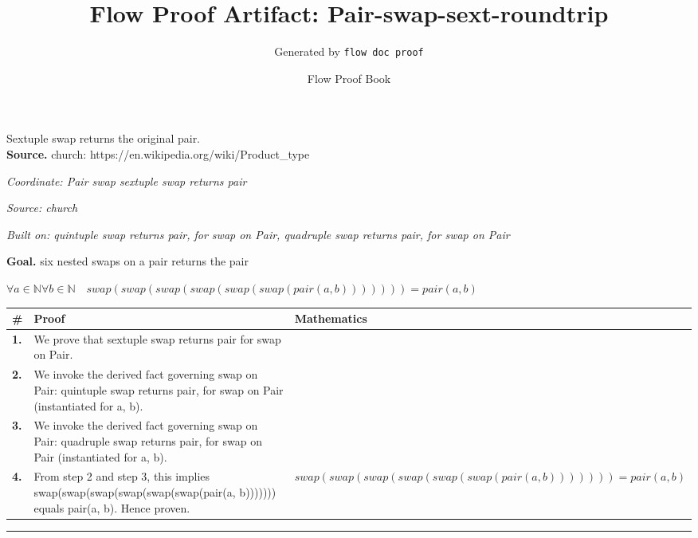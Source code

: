 \documentclass[11pt]{article}
\title{Flow Proof Artifact: Pair-swap-sext-roundtrip}
\author{Generated by \texttt{flow doc proof}}
\date{Flow Proof Book}
\theoremstyle{definition}
\begin{document}
\maketitle
Sextuple swap returns the original pair.\\[0.5em]
\textbf{Source.} church: https://en.wikipedia.org/wiki/Product\_type\\[0.5em]
\bigskip
{}\par
\smallskip\noindent\textit{Coordinate: Pair \cdot swap \cdot sextuple swap returns pair}\par
\smallskip\noindent\textit{Source: church}\par
\smallskip\noindent\textit{Built on: quintuple swap returns pair, for swap on Pair, quadruple swap returns pair, for swap on Pair}\par
\medskip
\noindent\textbf{Goal.} six nested swaps on a pair returns the pair\par
\noindent$\displaystyle \forall a \in \mathbb{N} \forall b \in \mathbb{N}\quad swap(swap(swap(swap(swap(swap(pair(a, b))))))) = pair(a, b)$\par
\medskip
\noindent
\begin{tabular}{@{} >{\raggedright\arraybackslash}p{} >{\raggedright\arraybackslash}p{} >{\raggedleft\arraybackslash}p{} @{}}
\textbf{\#} & \textbf{Proof} & \textbf{Mathematics} \\
\midrule
\textbf{1.} & We prove that sextuple swap returns pair for swap on Pair. & \\[0.45em]
\textbf{2.} & We invoke the derived fact governing swap on Pair: quintuple swap returns pair, for swap on Pair (instantiated for a, b). & \\[0.45em]
\textbf{3.} & We invoke the derived fact governing swap on Pair: quadruple swap returns pair, for swap on Pair (instantiated for a, b). & \\[0.45em]
\textbf{4.} & From step 2 and step 3, this implies swap(swap(swap(swap(swap(swap(pair(a, b))))))) equals pair(a, b). Hence proven. & $\displaystyle swap(swap(swap(swap(swap(swap(pair(a, b))))))) = pair(a, b)$ \\[0.45em]
\bottomrule
\end{tabular}
\label{thm:Pair-swap-sextuple_swap_returns_pair}
\par\medskip\hrule
\end{document}

